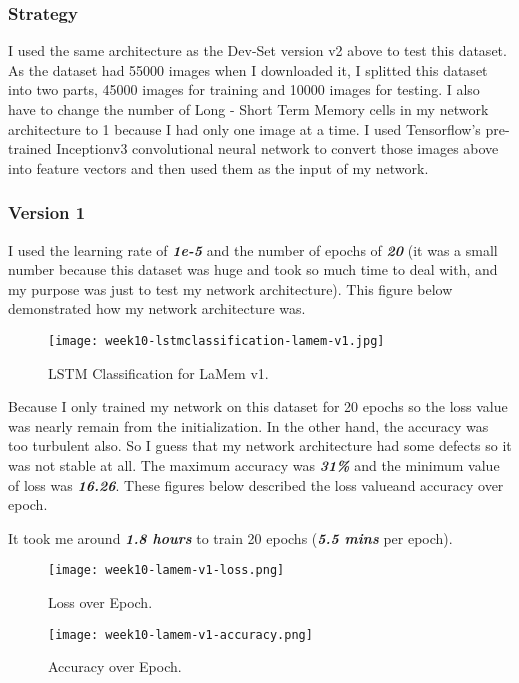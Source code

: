 \subsubsection{Strategy}
I used the same architecture as the Dev-Set version v2 above to test this dataset. As the dataset had 55000 images when I downloaded it, I splitted this dataset into two parts, 45000 images for training and 10000 images for testing. I also have to change the number of Long - Short Term Memory cells in my network architecture to 1 because I had only one image at a time. I used Tensorflow's pre-trained Inceptionv3 convolutional neural network to convert those images above into feature vectors and then used them as the input of my network. 

\subsubsection{Version 1}
I used the learning rate of \textbf{\emph{1e-5}} and the number of epochs of \textbf{\emph{20}} (it was a small number because this dataset was huge and took so much time to deal with, and my purpose was just to test my network architecture). This figure below demonstrated how my network architecture was.

\begin{figure}[!ht]
\centering
\texttt{[image: week10-lstmclassification-lamem-v1.jpg]}
\caption{LSTM Classification for LaMem v1.}
\end{figure}

Because I only trained my network on this dataset for 20 epochs so the loss value was nearly remain from the initialization. In the other hand, the accuracy was too turbulent also. So I guess that my network architecture had some defects so it was not stable at all. The maximum accuracy was \textbf{\emph{31\%}} and the minimum value of loss was \textbf{\emph{16.26}}. These figures below described the loss valueand accuracy over epoch.

It took me around \textbf{\emph{1.8 hours}} to train 20 epochs (\textbf{\emph{5.5 mins}} per epoch).

\begin{figure}[!ht]
\centering
\texttt{[image: week10-lamem-v1-loss.png]}
\caption{Loss over Epoch.}
\end{figure}

\begin{figure}[!ht]
\centering
\texttt{[image: week10-lamem-v1-accuracy.png]}
\caption{Accuracy over Epoch.}
\end{figure}